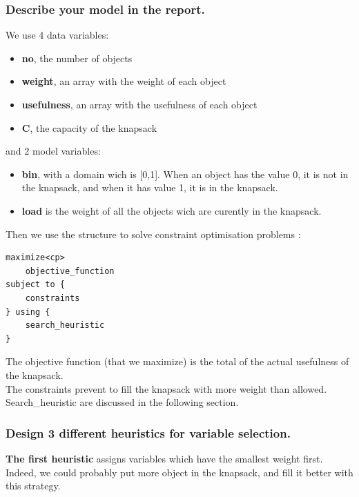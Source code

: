\documentclass[a4paper ,12pt,french]{article}
\begin{document}
\subsubsection{Describe your model in the report.}

We use 4 data variables: 
\begin{itemize}
\item \textbf{no}, the number of objects
\item \textbf{weight}, an array with the weight of each object
\item \textbf{usefulness}, an array with the usefulness of each object
\item \textbf{C}, the capacity of the knapsack\\
\end{itemize}

and 2 model variables:
\begin{itemize}
\item \textbf{bin}, with a domain wich is [0,1]. When an object has the value 0, it is not in the knapsack, and when it has value 1, it is in the knapsack.
\item \textbf{load} is the weight of all the objects wich are curently in the knapsack.\\
\end{itemize}

Then we use the structure to solve constraint optimisation problems :
\begin{verbatim}
maximize<cp>
    objective_function
subject to {
    constraints
} using {
    search_heuristic
}
\end{verbatim}

The objective function (that we maximize) is the total of the actual usefulness of the knapsack.\\
The constraints prevent to fill the knapsack with more weight than allowed.\\
Search\_heuristic are discussed in the following section.



\subsubsection{Design 3 different heuristics for variable selection.}
\textbf{The first heuristic} assigns variables which have the smallest weight first. Indeed, we could probably put more object in the knapsack, and fill it better with this strategy.\\
\end{document}
